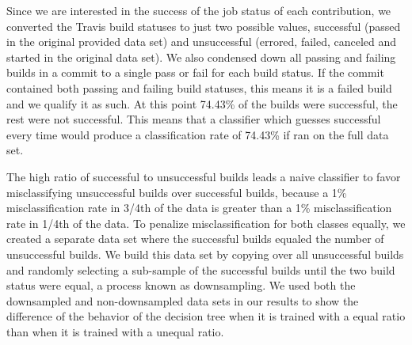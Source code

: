 \documentclass[10pt, conference]{IEEEtran}
\begin{document}
Since we are interested in the success of the job status of each contribution, we 
converted the Travis build statuses to just two possible values,
successful (passed in the original provided data set) and unsuccessful 
(errored, failed, canceled
and started in the original data set). We also condensed down all passing and
failing builds in a commit to a single pass or fail for each build status.  If
the commit contained both passing and failing build statuses, this means it is a failed build and we qualify it as such.
At this point 74.43\% of the builds were successful, the rest were not
successful.  This means that a classifier which guesses successful every time
would produce a classification rate of 74.43\% if ran on the full data
set. 

The high ratio of successful to unsuccessful builds leads a naive classifier to 
favor misclassifying unsuccessful builds over successful builds, because a 1\%
misclassification rate in 3/4th of the data is greater than a 1\%
misclassification rate in 1/4th of the data.  To penalize misclassification for
both classes equally, we created a separate data set where the
successful builds equaled the number of unsuccessful builds.  
We build this data set by copying over all unsuccessful builds and randomly
selecting a sub-sample of the successful builds until the two build status were
equal, a process known as downsampling.  We used 
both the downsampled and non-downsampled data sets in our results to show the 
difference of the behavior of the decision tree when it is trained with a equal 
ratio than when it is trained with a unequal ratio.
\end{document}
